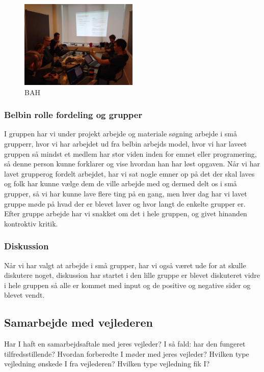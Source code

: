 \documentclass[a4paper,12pt,twoside,openright]{memoir}
\begin{document}
            \begin{figure}[ht!]
                \centering
                \includegraphics[width=0.5\textwidth]{Images/8.jpg}
                \caption{BAH}
                \label{4}
            \end{figure}

            \subsubsection{Belbin rolle fordeling og grupper}
            I gruppen har vi under projekt arbejde og materiale søgning arbejde i små grupperr, hvor vi har arbejdet ud fra belbin arbejds model, hvor vi har laveet  gruppen så mindst et medlem har stor viden inden for emnet eller programering, så denne person kunne forklarer og vise hvordan han har løst opgaven. 
            Når vi har lavet grupperog fordelt arbejdet, har vi sat nogle emner op på det der skal laves og folk har kunne vælge dem de ville arbejde med og dermed delt os i små grupper, så vi har kunne lave flere ting på en gang, men hver dag har vi lavet gruppe møde på hvad der er blevet laver  og hvor langt de enkelte grupper er. Efter gruppe arbejde har vi snakket  om det i hele  gruppen, og givet  hinanden kontroktiv kritik.
         
            \subsubsection{Diskussion}
            Når vi har valgt at arbejde i små grupper, har vi også været ude for at skulle diskutere noget, diskussion har startet i den lille gruppe er blevet diskuteret vidre i hele gruppen så alle er kommet med input og de positive og negative sider og blevet vendt. 

        \subsection{Samarbejde med vejlederen}
        Har I haft en samarbejdsaftale med jeres vejleder? I så fald: har den fungeret tilfredsstillende? 
        Hvordan forberedte I møder med jeres vejleder? 
        Hvilken type vejledning ønskede I fra vejlederen? Hvilken type vejledning fik I?  
\end{document}

